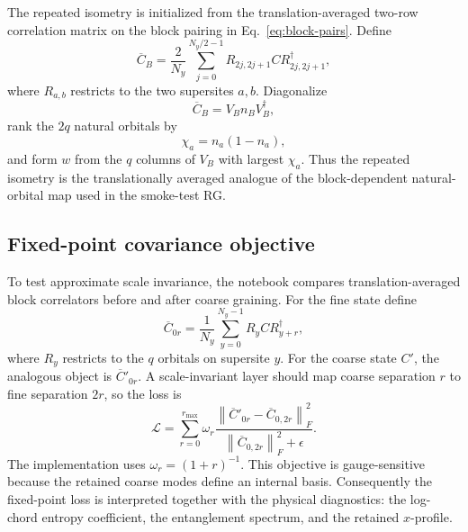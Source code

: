 \documentclass[aps,prb,twocolumn,floatfix]{revtex4-2}
\begin{document}
The repeated isometry is initialized from the translation-averaged two-row
correlation matrix on the block pairing in Eq.~\eqref{eq:block-pairs}.  Define
\begin{equation}
  \overline{C}_{B}
  =
  \frac{2}{N_y}
  \sum_{j=0}^{N_y/2-1}
  R_{2j,2j+1} C R_{2j,2j+1}^\dagger,
  \label{eq:avg-block-c}
\end{equation}
where \(R_{a,b}\) restricts to the two supersites \(a,b\).  Diagonalize
\begin{equation}
  \overline{C}_B = V_B n_B V_B^\dagger,
\end{equation}
rank the \(2q\) natural orbitals by
\begin{equation}
  \chi_a = n_a(1-n_a),
\end{equation}
and form \(w\) from the \(q\) columns of \(V_B\) with largest \(\chi_a\).
Thus the repeated isometry is the translationally averaged analogue of the
block-dependent natural-orbital map used in the smoke-test RG.

\subsection{Fixed-point covariance objective}

To test approximate scale invariance, the notebook compares translation-averaged
block correlators before and after coarse graining.  For the fine state define
\begin{equation}
  \overline{C}_{0r}
  =
  \frac{1}{N_y}
  \sum_{y=0}^{N_y-1}
  R_y C R_{y+r}^\dagger,
  \label{eq:avg-correlator}
\end{equation}
where \(R_y\) restricts to the \(q\) orbitals on supersite \(y\).  For the
coarse state \(C'\), the analogous object is \(\overline{C}'_{0r}\).  A
scale-invariant layer should map coarse separation \(r\) to fine separation
\(2r\), so the loss is
\begin{equation}
  \mathcal{L}
  =
  \sum_{r=0}^{r_{\max}}
  \omega_r
  \frac{
    \left\|
      \overline{C}'_{0r}-\overline{C}_{0,2r}
    \right\|_F^2
  }{
    \left\|
      \overline{C}_{0,2r}
    \right\|_F^2+\epsilon
  }.
  \label{eq:fixed-point-loss}
\end{equation}
The implementation uses \(\omega_r=(1+r)^{-1}\).  This objective is
gauge-sensitive because the retained coarse modes define an internal basis.
Consequently the fixed-point loss is interpreted together with the physical
diagnostics: the log-chord entropy coefficient, the entanglement spectrum, and
the retained \(x\)-profile.
\end{document}

